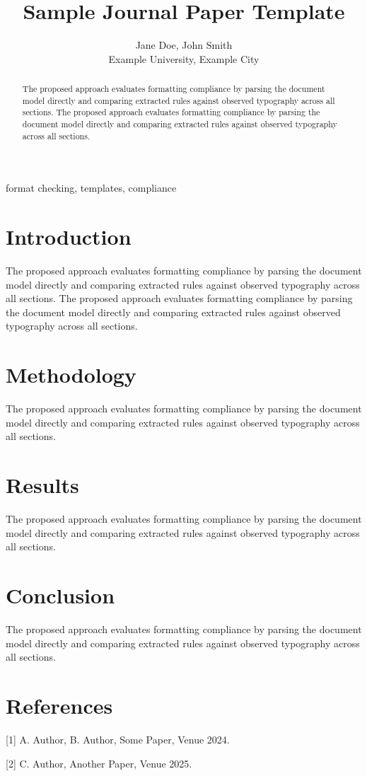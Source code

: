 \documentclass[a4paper,twocolumn,11pt]{article}
\title{Sample Journal Paper Template}
\author{Jane Doe, John Smith\\ Example University, Example City}
\date{}
\begin{document}
\maketitle

\begin{abstract}
The proposed approach evaluates formatting compliance by parsing the document model directly and comparing extracted rules against observed typography across all sections. The proposed approach evaluates formatting compliance by parsing the document model directly and comparing extracted rules against observed typography across all sections.
\end{abstract}

\begin{keywords}
format checking, templates, compliance
\end{keywords}

\section{Introduction}
The proposed approach evaluates formatting compliance by parsing the document model directly and comparing extracted rules against observed typography across all sections. The proposed approach evaluates formatting compliance by parsing the document model directly and comparing extracted rules against observed typography across all sections.

\section{Methodology}
The proposed approach evaluates formatting compliance by parsing the document model directly and comparing extracted rules against observed typography across all sections.

\section{Results}
The proposed approach evaluates formatting compliance by parsing the document model directly and comparing extracted rules against observed typography across all sections.

\section{Conclusion}
The proposed approach evaluates formatting compliance by parsing the document model directly and comparing extracted rules against observed typography across all sections.

\section{References}
[1] A. Author, B. Author, Some Paper, Venue 2024.

[2] C. Author, Another Paper, Venue 2025.
\end{document}
